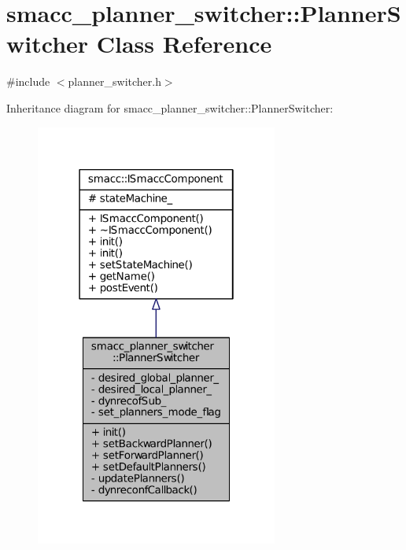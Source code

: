 \hypertarget{classsmacc__planner__switcher_1_1PlannerSwitcher}{}\section{smacc\+\_\+planner\+\_\+switcher\+:\+:Planner\+Switcher Class Reference}
\label{classsmacc__planner__switcher_1_1PlannerSwitcher}


{\ttfamily \#include $<$planner\+\_\+switcher.\+h$>$}



Inheritance diagram for smacc\+\_\+planner\+\_\+switcher\+:\+:Planner\+Switcher\+:
\nopagebreak
\begin{figure}[H]
\begin{center}
\leavevmode
\includegraphics[width=226pt]{classsmacc__planner__switcher_1_1PlannerSwitcher__inherit__graph}
\end{center}
\end{figure}


